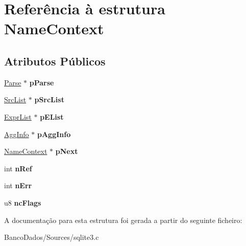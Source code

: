 \hypertarget{struct_name_context}{\section{Referência à estrutura Name\-Context}
\label{struct_name_context}
}
\subsection*{Atributos Públicos}
\begin{DoxyCompactItemize}
\item 
\hypertarget{struct_name_context_a14635249bf75d5e18124089571dd2386}{\hyperlink{struct_parse}{Parse} $\ast$ {\bfseries p\-Parse}}\label{struct_name_context_a14635249bf75d5e18124089571dd2386}

\item 
\hypertarget{struct_name_context_a6ede21da33e2e9bd3d0c5fe90a3ec72c}{\hyperlink{struct_src_list}{Src\-List} $\ast$ {\bfseries p\-Src\-List}}\label{struct_name_context_a6ede21da33e2e9bd3d0c5fe90a3ec72c}

\item 
\hypertarget{struct_name_context_a8c752d7fb9b28179156c569cc57ba6f2}{\hyperlink{struct_expr_list}{Expr\-List} $\ast$ {\bfseries p\-E\-List}}\label{struct_name_context_a8c752d7fb9b28179156c569cc57ba6f2}

\item 
\hypertarget{struct_name_context_aeb3ff72c03dd770d421cadc2195a5644}{\hyperlink{struct_agg_info}{Agg\-Info} $\ast$ {\bfseries p\-Agg\-Info}}\label{struct_name_context_aeb3ff72c03dd770d421cadc2195a5644}

\item 
\hypertarget{struct_name_context_a82ce0ec8a3cc3d792e1f38bb5e0ad5fc}{\hyperlink{struct_name_context}{Name\-Context} $\ast$ {\bfseries p\-Next}}\label{struct_name_context_a82ce0ec8a3cc3d792e1f38bb5e0ad5fc}

\item 
\hypertarget{struct_name_context_ad68616ce2a58fa1b135e0dcf953bdc97}{int {\bfseries n\-Ref}}\label{struct_name_context_ad68616ce2a58fa1b135e0dcf953bdc97}

\item 
\hypertarget{struct_name_context_aba0b89b42e945c4c96d57a8fe011329c}{int {\bfseries n\-Err}}\label{struct_name_context_aba0b89b42e945c4c96d57a8fe011329c}

\item 
\hypertarget{struct_name_context_a3dcc2e5442b6a74440a15226139b78d2}{u8 {\bfseries nc\-Flags}}\label{struct_name_context_a3dcc2e5442b6a74440a15226139b78d2}

\end{DoxyCompactItemize}


A documentação para esta estrutura foi gerada a partir do seguinte ficheiro\-:\begin{DoxyCompactItemize}
\item 
Banco\-Dados/\-Sources/sqlite3.\-c\end{DoxyCompactItemize}
